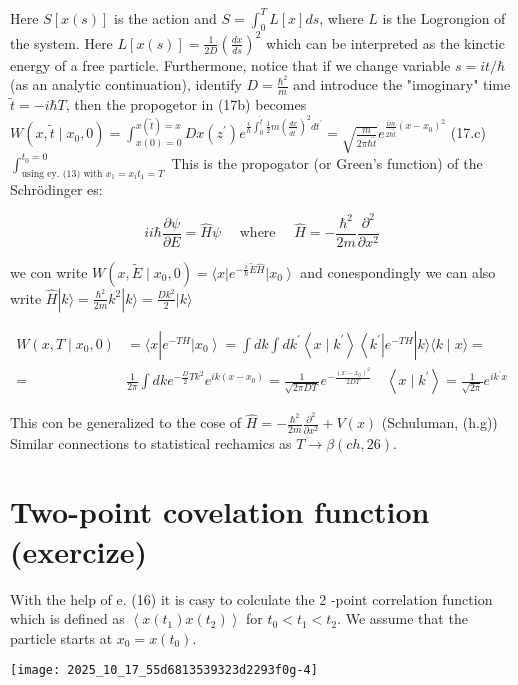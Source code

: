 Here $S[x(s)]$ is the action and $S=\int_{0}^{T} L[x] d s$, where $L$ is the Logrongion of the system. Here $L[x(s)]=\frac{1}{2 D}\left(\frac{d x}{d s}\right)^{2}$ which can be interpreted as the kinctic energy of a free particle. Furthermone, notice that if we change variable $s=i t / \hbar$ (as an analytic continuation), identify $D=\frac{\hbar^{2}}{m}$ and introduce the "imoginary" time $\tilde{t}=-i \hbar T$, then the propogetor in (17b) becomes
$W\left(x, \tilde{t} \mid x_{0}, 0\right)=\int_{x(0)=0}^{x(\tilde{t})=x} D x\left(z^{\prime}\right) e^{\frac{i}{\hbar} \int_{0}^{\tilde{t}} \frac{1}{2} m\left(\frac{d x}{d t^{\prime}}\right)^{2} d t^{\prime}}=\sqrt{\frac{m}{2 \pi \hbar \tilde{t}}} e^{\frac{i m}{2 \hbar \tilde{t}}\left(x-x_{0}\right)^{2}}$
(17.c) $\int_{\text {using ey. (13) with } x_{1}=x_{i} t_{1}=T}^{t_{0}=0}$
This is the propogator (or Green's function) of the Schrödinger es:

$$ 
i 
 i \hbar \frac{\partial \psi}{\partial E}=\hat{H} \psi \quad \text { where } \quad \hat{H}=-\frac{\hbar^{2}}{2 m} \frac{\partial^{2}}{\partial x^{2}}
$$ 

we con write $W\left(x, \tilde{E} \mid x_{0}, 0\right)=\langle x| e^{-\frac{i}{\hbar} \tilde{E} \hat{H}}\left|x_{0}\right\rangle$
and conespondingly we can also write $\hat{H}|k\rangle=\frac{\hbar^{2}}{2 m} k^{2}|k\rangle=\frac{D k^{2}}{2}|k\rangle$

$$ 
\begin{aligned}
W\left(x, T \mid x_{0}, 0\right) & =\langle x| e^{-T H}\left|x_{0}\right\rangle=\int d k \int d k^{\prime}\left\langle x \mid k^{\prime}\right\rangle\left\langle k^{\prime}\right| e^{-T H}|k\rangle\langle k \mid x\rangle=\\
= & \frac{1}{2 \pi} \int d k e^{-\frac{D}{2} T k^{2}} e^{i k\left(x-x_{0}\right)}=\frac{1}{\sqrt{2 \pi D T}} e^{-\frac{\left(x-x_{0}\right)^{2}}{2 D T}} \quad\left\langle x \mid k^{\prime}\right\rangle=\frac{1}{\sqrt{2 \pi}} e^{i k^{\prime} x}
\end{aligned}
$$ 

This con be generalized to the cose of $\hat{H}=-\frac{\hbar^{2}}{2 m} \frac{\partial^{2}}{\partial x^{2}}+V(x)$ (Schuluman, (h.g)) Similar connections to statistical rechamics as $T \rightarrow \beta(c h, 26)$.

\section*{Two-point covelation function (exercize)}
With the help of e. (16) it is casy to colculate the 2 -point correlation function which is defined as $\left\langle x\left(t_{1}\right) x\left(t_{2}\right)\right\rangle$ for $t_{0}<t_{1}<t_{2}$. We assume that the particle starts at $x_{0}=x\left(t_{0}\right)$.
\begin{center}
\texttt{[image: 2025\_10\_17\_55d6813539323d2293f0g-4]}
\end{center}

